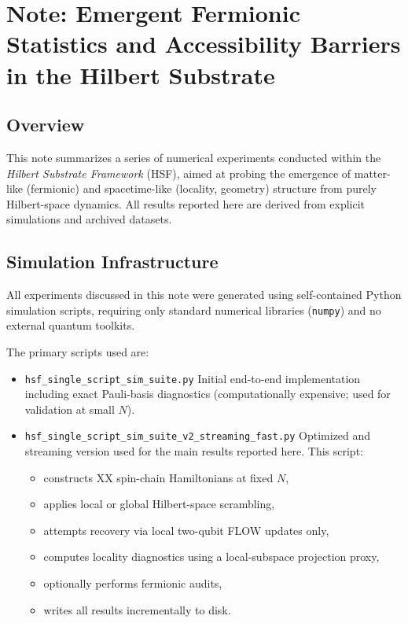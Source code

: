 \section*{Note: Emergent Fermionic Statistics and Accessibility Barriers in the Hilbert Substrate}

\subsection*{Overview}

This note summarizes a series of numerical experiments conducted within the
\emph{Hilbert Substrate Framework} (HSF), aimed at probing the emergence of
matter-like (fermionic) and spacetime-like (locality, geometry) structure
from purely Hilbert-space dynamics. All results reported here are derived
from explicit simulations and archived datasets.

\subsection*{Simulation Infrastructure}

All experiments discussed in this note were generated using self-contained
Python simulation scripts, requiring only standard numerical libraries
(\texttt{numpy}) and no external quantum toolkits.

The primary scripts used are:

\begin{itemize}
    \item \texttt{hsf\_single\_script\_sim\_suite.py}  
    Initial end-to-end implementation including exact Pauli-basis diagnostics
    (computationally expensive; used for validation at small $N$).

    \item \texttt{hsf\_single\_script\_sim\_suite\_v2\_streaming\_fast.py}  
    Optimized and streaming version used for the main results reported here.
    This script:
    \begin{itemize}
        \item constructs XX spin-chain Hamiltonians at fixed $N$,
        \item applies local or global Hilbert-space scrambling,
        \item attempts recovery via local two-qubit FLOW updates only,
        \item computes locality diagnostics using a local-subspace projection proxy,
        \item optionally performs fermionic audits,
        \item writes all results incrementally to disk.
    \end{itemize}
\end{itemize}


